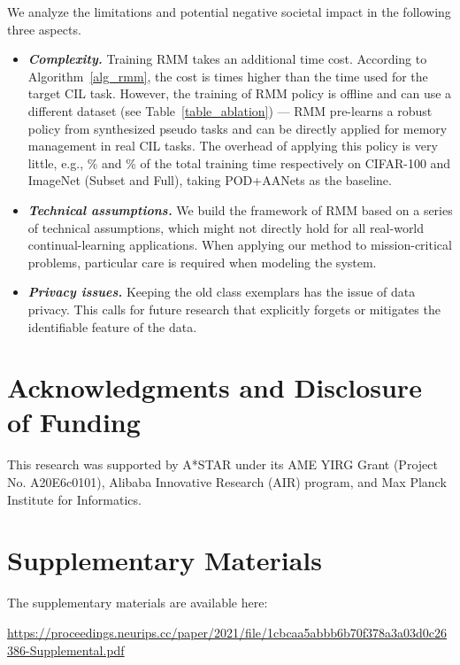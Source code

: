 \documentclass{article}
\begin{document}
We analyze the limitations and potential negative societal impact in the following three aspects.
\begin{itemize}[leftmargin=*]
    \item 
 \textbf{\emph{Complexity.}}
   Training RMM takes an additional time cost. According to Algorithm~\ref{alg_rmm}, the cost is  times higher than the time used for the target CIL task. 
   However, the training of RMM policy is offline and can use a different dataset (see Table~\ref{table_ablation}) --- RMM pre-learns a robust policy from synthesized pseudo tasks and can be directly applied for memory management in real CIL tasks. The overhead of applying this policy is very little, e.g., \% and \% of the total training time respectively on CIFAR-100 and ImageNet (Subset and Full), taking POD+AANets as the baseline.
    \item 
    \textbf{\emph{Technical assumptions.}} We build the framework of RMM based on a series of technical assumptions, which might not directly hold for all real-world continual-learning applications. When applying our method to mission-critical problems, particular care is required when modeling the system.
    \item 
    \textbf{\emph{Privacy issues.}} Keeping the old class exemplars has the issue of data privacy. This calls for future research that explicitly forgets or mitigates the identifiable feature of the data.
\end{itemize}

\section*{Acknowledgments and Disclosure of Funding}

This research was supported by A*STAR under its AME YIRG Grant (Project No. A20E6c0101), Alibaba Innovative Research (AIR) program, and Max Planck Institute for Informatics. 
\clearpage
{}

\clearpage

\section*{Supplementary Materials}

The supplementary materials are available here:

\href{https://proceedings.neurips.cc/paper/2021/file/1cbcaa5abbb6b70f378a3a03d0c26386-Supplemental.pdf}{https://proceedings.neurips.cc/paper/2021/file/1cbcaa5abbb6b70f378a3a03d0c26386-Supplemental.pdf}
\end{document}
